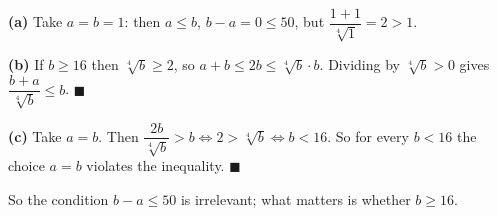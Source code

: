 \textbf{(a)} Take $a=b=1$: then $a\le b$, $b-a=0\le50$, but $\dfrac{1+1}{\sqrt[4]1}=2>1$.

\textbf{(b)} If $b\ge16$ then $\sqrt[4]b\ge2$, so $a+b\le2b\le\sqrt[4]b\cdot b$. Dividing by $\sqrt[4]b>0$ gives $\dfrac{b+a}{\sqrt[4]b}\le b$. $\blacksquare$

\textbf{(c)} Take $a=b$. Then $\dfrac{2b}{\sqrt[4]b}>b\iff2>\sqrt[4]b\iff b<16$. So for every $b<16$ the choice $a=b$ violates the inequality. $\blacksquare$

So the condition $b-a\le50$ is irrelevant; what matters is whether $b\ge16$.
